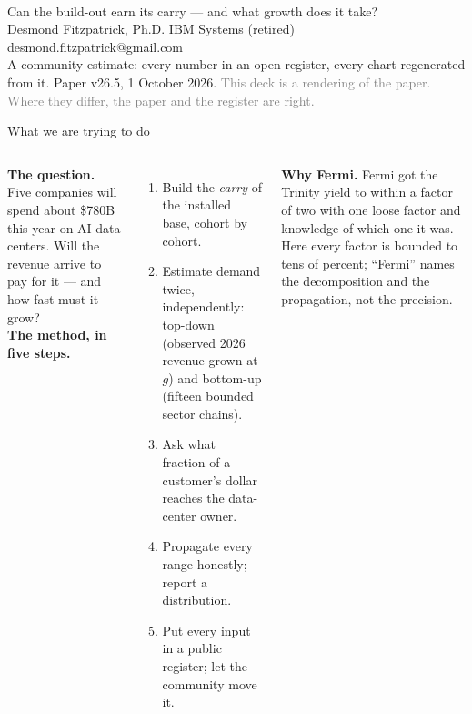 \documentclass[aspectratio=169,11pt]{beamer}
\newcommand{\claim}[1]{\par\vspace{2pt}{\small\textcolor{accent}{#1}}\par}
\begin{document}
\begin{frame}
\vspace{1.2cm}{\Huge\bfseries The Macroeconomic Limits of AI Compute}\\[6pt]
{\Large Can the build-out earn its carry --- and what growth does it take?}\\[14pt]
{\normalsize Desmond Fitzpatrick, Ph.D. \quad IBM Systems (retired) \quad desmond.fitzpatrick@gmail.com}\\[4pt]
{\small A community estimate: every number in an open register, every chart regenerated from it. Paper v26.5, 1 October 2026.}
\vfill{\footnotesize\textcolor{gray}{This deck is a rendering of the paper. Where they differ, the paper and the register are right.}}
\end{frame}

\begin{frame}[shrink=6]{What we are trying to do}
\claim{Replace assertion with arithmetic that anyone can check and improve.}
\footnotesize
\begin{columns}[T]
\textbf{The question.} Five companies will spend about \$780B this year on AI data centers. Will the revenue arrive to pay for it --- and how fast must it grow?\\[6pt]
\textbf{The method, in five steps.}
\begin{enumerate}\setlength{\itemsep}{1pt}
\item Build the \emph{carry} of the installed base, cohort by cohort.
\item Estimate demand twice, independently: top-down (observed 2026 revenue grown at $g$) and bottom-up (fifteen bounded sector chains).
\item Ask what fraction of a customer's dollar reaches the data-center owner.
\item Propagate every range honestly; report a distribution.
\item Put every input in a public register; let the community move it.
\end{enumerate}
\textbf{Why Fermi.} Fermi got the Trinity yield to within a factor of two with one loose factor and knowledge of which one it was. Here every factor is bounded to tens of percent; ``Fermi'' names the decomposition and the propagation, not the precision.
\end{columns}
\end{frame}
\end{document}
